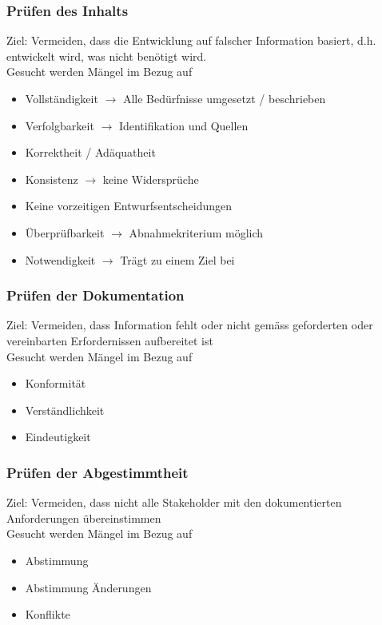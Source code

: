 \documentclass{report}
\theoremstyle{definition}
\theoremstyle{example}
\begin{document}
\subsubsection{Prüfen des Inhalts}
Ziel: Vermeiden, dass die Entwicklung auf falscher Information basiert, d.h. entwickelt wird, was nicht benötigt wird.\\
Gesucht werden Mängel im Bezug auf
\begin{itemize}
   \item Vollständigkeit $\rightarrow$ Alle Bedürfnisse umgesetzt / beschrieben
   \item Verfolgbarkeit $\rightarrow$ Identifikation und Quellen
   \item Korrektheit / Adäquatheit
   \item Konsistenz $\rightarrow$ keine Widersprüche
   \item Keine vorzeitigen Entwurfsentscheidungen
   \item Überprüfbarkeit $\rightarrow$ Abnahmekriterium möglich
   \item Notwendigkeit $\rightarrow$ Trägt zu einem Ziel bei
\end{itemize}

\subsubsection{Prüfen der Dokumentation}
Ziel: Vermeiden, dass Information fehlt oder nicht gemäss geforderten oder vereinbarten Erfordernissen aufbereitet ist\\
Gesucht werden Mängel im Bezug auf
\begin{itemize}
   \item Konformität
   \item Verständlichkeit
   \item Eindeutigkeit
\end{itemize}

\subsubsection{Prüfen der Abgestimmtheit}
Ziel: Vermeiden, dass nicht alle Stakeholder mit den dokumentierten Anforderungen übereinstimmen\\
Gesucht werden Mängel im Bezug auf
\begin{itemize}
   \item Abstimmung
   \item Abstimmung Änderungen
   \item Konflikte
\end{itemize}
\end{document}
